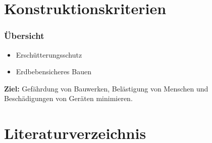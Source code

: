 \documentclass[hyperref={pdfpagemode=FullScreen, colorlinks=false}]{beamer}
\begin{document}
\maketitle


\section{Konstruktionskriterien}

\begin{frame}
\frametitle{Übersicht}
\begin{itemize} %
 \item Erschütterungsschutz   
 \item Erdbebensicheres Bauen
\end{itemize}

\bigskip

\textbf{Ziel:} Gefährdung von Bauwerken, Belästigung von Menschen und Beschädigungen von Geräten minimieren.
\end{frame}







\section*{Literaturverzeichnis}

\begin{frame}[allowframebreaks]{}
	\printbibliography
\end{frame}
\end{document}
